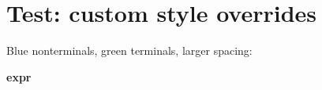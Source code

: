 \documentclass{article}
\begin{document}
\section*{Test: custom style overrides}

Blue nonterminals, green terminals, larger spacing:

\bigskip
\noindent\textbf{expr}
\par\medskip
{}
\end{document}

